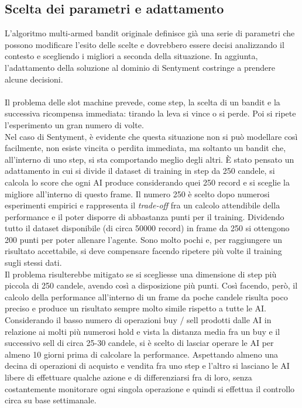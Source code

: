 \documentclass[a4paper,12pt]{report}
\begin{document}
\begin{fig}
\subsection{Scelta dei parametri e adattamento}
L'algoritmo multi-armed bandit originale definisce già una serie di parametri che possono modificare l'esito delle scelte e dovrebbero essere decisi analizzando il contesto e scegliendo i migliori a seconda della situazione. In aggiunta, l'adattamento della soluzione al dominio di Sentyment costringe a prendere alcune decisioni.\\~\\ Il problema delle slot machine prevede, come step, la scelta di un bandit e la successiva ricompensa immediata: tirando la leva si vince o si perde. Poi si ripete l'esperimento un gran numero di volte.\\ Nel caso di Sentyment, è evidente che questa situazione non si può modellare così facilmente, non esiste vincita o perdita immediata, ma soltanto un bandit che, all'interno di uno step, si sta comportando meglio degli altri. È stato pensato un adattamento in cui si divide il dataset di training in step da 250 candele, si calcola lo score che ogni AI produce considerando quei 250 record e si sceglie la migliore all'interno di questo frame. Il numero 250 è scelto dopo numerosi esperimenti empirici e rappresenta il \textit{trade-off} fra un calcolo attendibile della performance e il poter disporre di abbastanza punti per il training. Dividendo tutto il dataset disponibile (di circa 50000 record) in frame da 250 si ottengono 200 punti per poter allenare l'agente. Sono molto pochi e, per raggiungere un risultato accettabile, si deve compensare facendo ripetere più volte il training sugli stessi dati.\\ Il problema risulterebbe mitigato se si scegliesse una dimensione di step più piccola di 250 candele, avendo così a disposizione più punti. Così facendo, però, il calcolo della performance all'interno di un frame da poche candele risulta poco preciso e produce un risultato sempre molto simile rispetto a tutte le AI. Considerando il basso numero di operazioni buy / sell prodotti dalle AI in relazione ai molti più numerosi hold e vista la distanza media fra un buy e il successivo sell di circa 25-30 candele, si è scelto di lasciar operare le AI per almeno 10 giorni prima di calcolare la performance. Aspettando almeno una decina di operazioni di acquisto e vendita fra uno step e l'altro si lasciano le AI libere di effettuare qualche azione e di differenziarsi fra di loro, senza costantemente monitorare ogni singola operazione e quindi si effettua il controllo circa su base settimanale.

\end{fig}
\end{document}
